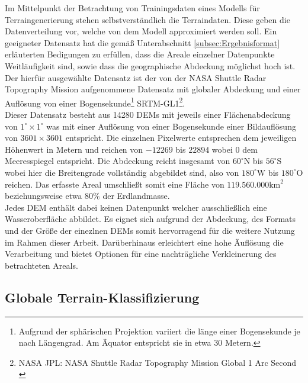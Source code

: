 Im Mittelpunkt der Betrachtung von Trainingsdaten eines Modells für Terraingenerierung stehen selbstverständlich die Terraindaten. Diese geben die Datenverteilung vor, welche von dem Modell approximiert werden soll. Ein geeigneter Datensatz hat die gemäß Unterabschnitt \ref{subsec:Ergebnisformat} erläuterten Bedigungen zu erfüllen, dass die Areale einzelner Datenpunkte Weitläufigkeit sind, sowie dass die geographische Abdeckung möglichst hoch ist. \\
Der hierfür ausgewählte Datensatz ist der von der NASA Shuttle Radar Topography Mission aufgenommene Datensatz mit globaler Abdeckung und einer Auflösung von einer Bogensekunde\footnote{
    Aufgrund der sphärischen Projektion variiert die länge einer Bogensekunde je nach Längengrad. Am Äquator entspricht sie in etwa 30 Metern.
} SRTM-GL1\footnote{
    NASA JPL: NASA Shuttle Radar Topography Mission Global 1 Arc Second
    \cite{nasa2013srtm}
}. \\
Dieser Datensatz besteht aus 14280 DEMs mit jeweils einer Flächenabdeckung von $1^{\circ}\times1^{\circ}$ was mit einer Auflösung von einer Bogensekunde einer Bildauflösung von $3601\times3601$ entspricht. Die einzelnen Pixelwerte entsprechen dem jeweiligen Höhenwert in Metern und reichen von $-12269$ bis $22894$ wobei $0$ dem Meeresspiegel entspricht. Die Abdeckung reicht insgesamt von $60^{\circ}\text{N}$ bis $56^{\circ}\text{S}$ wobei hier die Breitengrade vollständig abgebildet sind, also von $180^{\circ}\text{W}$ bis $180^{\circ}\text{O}$ reichen. Das erfasste Areal umschließt somit eine Fläche von $119.560.000\text{km}^2$ beziehungsweise etwa $80\%$ der Erdlandmasse.\\
Jedes DEM enthält dabei keinen Datenpunkt welcher ausschließlich eine Wasseroberfläche abbildet. Es eignet sich aufgrund der Abdeckung, des Formats und der Größe der einezlnen DEMs somit hervorragend für die weitere Nutzung im Rahmen dieser Arbeit. Darüberhinaus erleichtert eine hohe Äuflösung die Verarbeitung und bietet Optionen für eine nachträgliche Verkleinerung des betrachteten Areals.

\subsection{Globale Terrain-Klassifizierung}

